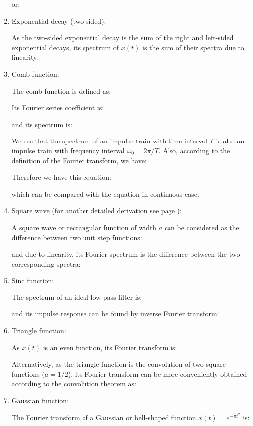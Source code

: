 \begin{enumerate}
	or:
	
	
	\item Exponential decay (two-sided):
	
	As the two-sided exponential decay is the sum of the right and left-sided 
	exponential decays, its spectrum of $x(t)$ is the sum of their spectra due 
	to linearity:
	
	
	\item Comb function:
	
	The comb function is defined as:
	
	Its Fourier series coefficient is:
	
	and its spectrum is:
	
	We see that the spectrum of an impulse train with time interval $T$ is also an impulse train with frequency interval $\omega_0=2\pi/T$. Also, according to the definition of the Fourier transform, we have:
	
	Therefore we have this equation:
	
	which can be compared with the equation in continuous case:
	
	
	
	\item Square wave (for another detailed derivation see page \pageref{fourier transform pulse square}):
	
	A square wave or rectangular function of width $a$ can be considered as the difference between two unit step functions:
	
	and due to linearity, its Fourier spectrum is the difference between 
	the two corresponding spectra:
	
	
	\item Sinc function:
	
	The spectrum of an ideal low-pass filter is:
	
	and its impulse response can be found by inverse Fourier transform:
	
	
	\item Triangle function:
	
	As $x(t)$ is an even function, its Fourier transform is:
	
	Alternatively, as the triangle function is the convolution of two square functions
	($a=1/2$), its Fourier transform can be more conveniently obtained according to the
	convolution theorem as: 
	
	
	\item Gaussian function:
	
	The Fourier transform of a Gaussian or bell-shaped function $x(t)=e^{-\pi t^2}$ is:
	

\end{enumerate}
